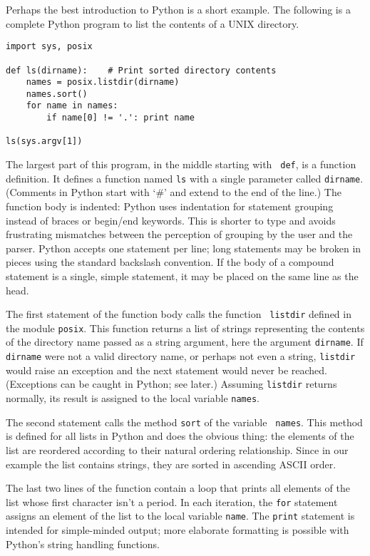 Perhaps the best introduction to Python is a short example.  The
following is a complete Python program to list the contents of a UNIX
directory.
\begin{verbatim}
import sys, posix

def ls(dirname):    # Print sorted directory contents
    names = posix.listdir(dirname)
    names.sort()
    for name in names:
        if name[0] != '.': print name

ls(sys.argv[1])
\end{verbatim}
The largest part of this program, in the middle starting with {\tt
def}, is a function definition.  It defines a function named {\tt ls}
with a single parameter called {\tt dirname}.  (Comments in Python
start with `\#' and extend to the end of the line.)  The function body
is indented: Python uses indentation for statement grouping instead of
braces or begin/end keywords.  This is shorter to type and avoids
frustrating mismatches between the perception of grouping by the user
and the parser.  Python accepts one statement per line; long
statements may be broken in pieces using the standard backslash
convention.  If the body of a compound statement is a single, simple
statement, it may be placed on the same line as the head.

The first statement of the function body calls the function {\tt
listdir} defined in the module {\tt posix}.  This function returns a
list of strings representing the contents of the directory name passed
as a string argument, here the argument {\tt dirname}.  If {\tt
dirname} were not a valid directory name, or perhaps not even a
string, {\tt listdir} would raise an exception and the next statement
would never be reached.  (Exceptions can be caught in Python; see
later.)  Assuming {\tt listdir} returns normally, its result is
assigned to the local variable {\tt names}.

The second statement calls the method {\tt sort} of the variable {\tt
names}.  This method is defined for all lists in Python and does the
obvious thing: the elements of the list are reordered according to
their natural ordering relationship.  Since in our example the list
contains strings, they are sorted in ascending ASCII order.

The last two lines of the function contain a loop that prints all
elements of the list whose first character isn't a period.  In each
iteration, the {\tt for} statement assigns an element of the list to
the local variable {\tt name}.  The {\tt print} statement is intended
for simple-minded output; more elaborate formatting is possible with
Python's string handling functions.

